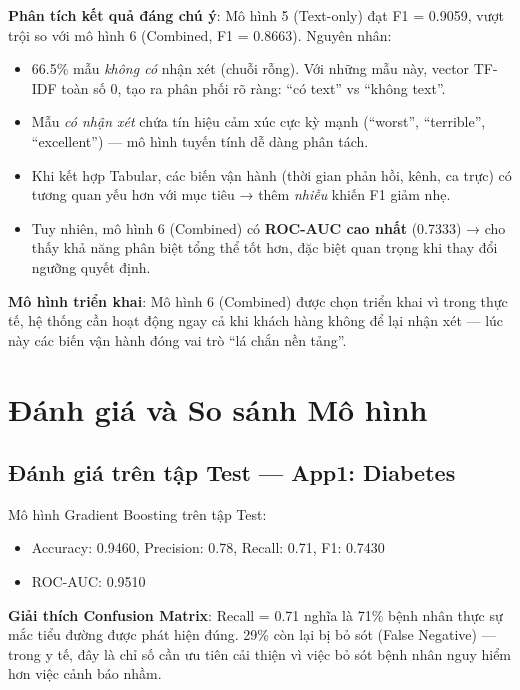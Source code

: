\documentclass[12pt, a4paper]{article}
\begin{document}
\textbf{Phân tích kết quả đáng chú ý}: Mô hình 5 (Text-only) đạt F1 = 0.9059, vượt trội so với mô hình 6 (Combined, F1 = 0.8663). Nguyên nhân:
\begin{itemize}
    \item 66.5\% mẫu \textit{không có} nhận xét (chuỗi rỗng). Với những mẫu này, vector TF-IDF toàn số 0, tạo ra phân phối rõ ràng: ``có text'' vs ``không text''.
    \item Mẫu \textit{có nhận xét} chứa tín hiệu cảm xúc cực kỳ mạnh (``worst'', ``terrible'', ``excellent'') — mô hình tuyến tính dễ dàng phân tách.
    \item Khi kết hợp Tabular, các biến vận hành (thời gian phản hồi, kênh, ca trực) có tương quan yếu hơn với mục tiêu → thêm \textit{nhiễu} khiến F1 giảm nhẹ.
    \item Tuy nhiên, mô hình 6 (Combined) có \textbf{ROC-AUC cao nhất} (0.7333) → cho thấy khả năng phân biệt tổng thể tốt hơn, đặc biệt quan trọng khi thay đổi ngưỡng quyết định.
\end{itemize}

\textbf{Mô hình triển khai}: Mô hình 6 (Combined) được chọn triển khai vì trong thực tế, hệ thống cần hoạt động ngay cả khi khách hàng không để lại nhận xét — lúc này các biến vận hành đóng vai trò ``lá chắn nền tảng''.

\section{Đánh giá và So sánh Mô hình}

\subsection{Đánh giá trên tập Test — App1: Diabetes}

Mô hình Gradient Boosting trên tập Test:
\begin{itemize}
    \item Accuracy: 0.9460, Precision: 0.78, Recall: 0.71, F1: 0.7430
    \item ROC-AUC: 0.9510
\end{itemize}

\textbf{Giải thích Confusion Matrix}: Recall = 0.71 nghĩa là 71\% bệnh nhân thực sự mắc tiểu đường được phát hiện đúng. 29\% còn lại bị bỏ sót (False Negative) — trong y tế, đây là chỉ số cần ưu tiên cải thiện vì việc bỏ sót bệnh nhân nguy hiểm hơn việc cảnh báo nhầm.
\end{document}
